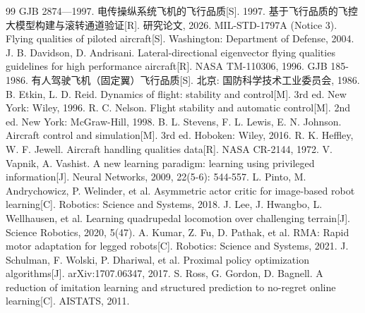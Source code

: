 \documentclass[UTF8,a4paper,11pt,fontset=fandol,scheme=plain]{ctexart}
\begin{document}
\begin{thebibliography}{99}
\small
{} GJB 2874—1997. 电传操纵系统飞机的飞行品质[S]. 1997.
 基于飞行品质的飞控大模型构建与滚转通道验证[R]. 研究论文, 2026.
 MIL-STD-1797A (Notice 3). Flying qualities of piloted aircraft[S]. Washington: Department of Defense, 2004.
 J. B. Davidson, D. Andrisani. Lateral-directional eigenvector flying qualities guidelines for high performance aircraft[R]. NASA TM-110306, 1996.
 GJB 185-1986. 有人驾驶飞机（固定翼）飞行品质[S]. 北京: 国防科学技术工业委员会, 1986.
 B. Etkin, L. D. Reid. Dynamics of flight: stability and control[M]. 3rd ed. New York: Wiley, 1996.
 R. C. Nelson. Flight stability and automatic control[M]. 2nd ed. New York: McGraw-Hill, 1998.
 B. L. Stevens, F. L. Lewis, E. N. Johnson. Aircraft control and simulation[M]. 3rd ed. Hoboken: Wiley, 2016.
 R. K. Heffley, W. F. Jewell. Aircraft handling qualities data[R]. NASA CR-2144, 1972.
 V. Vapnik, A. Vashist. A new learning paradigm: learning using privileged information[J]. Neural Networks, 2009, 22(5-6): 544-557.
 L. Pinto, M. Andrychowicz, P. Welinder, et al. Asymmetric actor critic for image-based robot learning[C]. Robotics: Science and Systems, 2018.
 J. Lee, J. Hwangbo, L. Wellhausen, et al. Learning quadrupedal locomotion over challenging terrain[J]. Science Robotics, 2020, 5(47).
 A. Kumar, Z. Fu, D. Pathak, et al. RMA: Rapid motor adaptation for legged robots[C]. Robotics: Science and Systems, 2021.
 J. Schulman, F. Wolski, P. Dhariwal, et al. Proximal policy optimization algorithms[J]. arXiv:1707.06347, 2017.
 S. Ross, G. Gordon, D. Bagnell. A reduction of imitation learning and structured prediction to no-regret online learning[C]. AISTATS, 2011.
\end{thebibliography}

\appendix
{}
\end{document}
